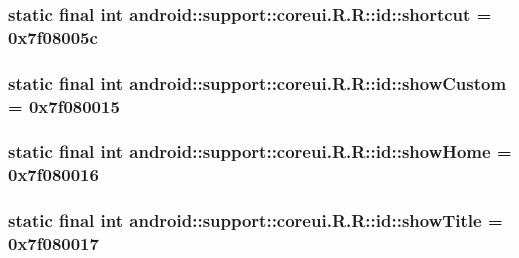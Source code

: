 \hypertarget{classandroid_1_1support_1_1coreui_1_1_r_1_1id_a5d25e0b772ee0c4c879c885327ef8f8}{
\subsubsection[{shortcut}]{\setlength{\rightskip}{0pt plus 5cm}static final int android::support::coreui.R.R::id::shortcut = 0x7f08005c}}
\label{classandroid_1_1support_1_1coreui_1_1_r_1_1id_a5d25e0b772ee0c4c879c885327ef8f8}


\hypertarget{classandroid_1_1support_1_1coreui_1_1_r_1_1id_2b7f65d21bcce7de6ff59daeae6ae152}{
\subsubsection[{showCustom}]{\setlength{\rightskip}{0pt plus 5cm}static final int android::support::coreui.R.R::id::showCustom = 0x7f080015}}
\label{classandroid_1_1support_1_1coreui_1_1_r_1_1id_2b7f65d21bcce7de6ff59daeae6ae152}


\hypertarget{classandroid_1_1support_1_1coreui_1_1_r_1_1id_14e6908449f65ea882373eb07946022f}{
\subsubsection[{showHome}]{\setlength{\rightskip}{0pt plus 5cm}static final int android::support::coreui.R.R::id::showHome = 0x7f080016}}
\label{classandroid_1_1support_1_1coreui_1_1_r_1_1id_14e6908449f65ea882373eb07946022f}


\hypertarget{classandroid_1_1support_1_1coreui_1_1_r_1_1id_ba8fa60639bd7bde2c4a4bfd25e4a549}{
\subsubsection[{showTitle}]{\setlength{\rightskip}{0pt plus 5cm}static final int android::support::coreui.R.R::id::showTitle = 0x7f080017}}
\label{classandroid_1_1support_1_1coreui_1_1_r_1_1id_ba8fa60639bd7bde2c4a4bfd25e4a549}


